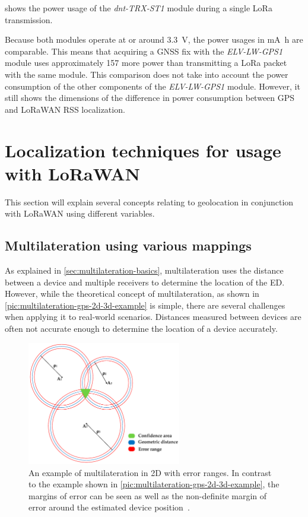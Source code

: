  shows the power usage of the \emph{dnt-TRX-ST1} module during a single \ac{LoRa} transmission.

Because both modules operate at or around \SI{3.3}{\volt}, the power usages in \si{\milli\ampere\hour} are comparable.
This means that acquiring a \ac{GNSS} fix with the \emph{ELV-LW-GPS1} module uses approximately \SI{157}{\times} more power than transmitting a \ac{LoRa} packet with the same module.
This comparison does not take into account the power consumption of the other components of the \emph{ELV-LW-GPS1} module.
However, it still shows the dimensions of the difference in power consumption between \ac{GPS} and \ac{LoRaWAN} \ac{RSS} localization.

\section{Localization techniques for usage with \acs{LoRaWAN}}\label{sec:lorawan-localization-techniques}

This section will explain several concepts relating to geolocation in conjunction with \ac{LoRaWAN} using different variables.

\subsection{Multilateration using various mappings}\label{sec:lorawan-multilateration}

As explained in \cref{sec:multilateration-basics}, multilateration uses the distance between a device and multiple receivers to determine the location of the \acl{ED}.
However, while the theoretical concept of multilateration, as shown in \cref{pic:multilateration-gps-2d-3d-example} is simple, there are several challenges when applying it to real-world scenarios.
Distances measured between devices are often not accurate enough to determine the location of a device accurately.

\begin{figure}[htbp]
    \centering
    \includegraphics[width=0.6\textwidth]{pictures/multilateration/multilateration_error_ranges.png}
    \caption{
        An example of multilateration in 2D with error ranges.
        In contrast to the example shown in \cref{pic:multilateration-gps-2d-3d-example}, the margins of error can be seen as well as the non-definite margin of error around the estimated device position~\protect\cite{kapoor_novel_2016}.
    }\label{pic:multilateration-with-error-ranges-example}
\end{figure}

